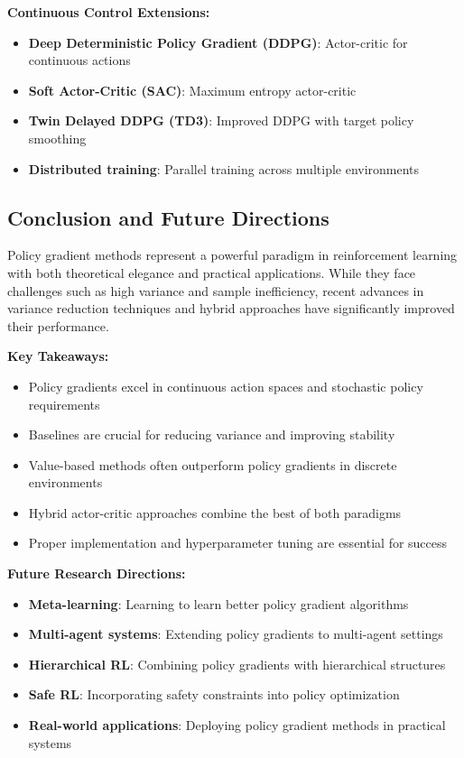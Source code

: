 \documentclass[12pt]{article}
\begin{document}
{{{\textbf{Continuous Control Extensions:}
\begin{itemize}
    \item \textbf{Deep Deterministic Policy Gradient (DDPG)}: Actor-critic for continuous actions
    \item \textbf{Soft Actor-Critic (SAC)}: Maximum entropy actor-critic
    \item \textbf{Twin Delayed DDPG (TD3)}: Improved DDPG with target policy smoothing
    \item \textbf{Distributed training}: Parallel training across multiple environments
\end{itemize}

\subsection{Conclusion and Future Directions}

Policy gradient methods represent a powerful paradigm in reinforcement learning with both theoretical elegance and practical applications. While they face challenges such as high variance and sample inefficiency, recent advances in variance reduction techniques and hybrid approaches have significantly improved their performance.

\textbf{Key Takeaways:}
\begin{itemize}
    \item Policy gradients excel in continuous action spaces and stochastic policy requirements
    \item Baselines are crucial for reducing variance and improving stability
    \item Value-based methods often outperform policy gradients in discrete environments
    \item Hybrid actor-critic approaches combine the best of both paradigms
    \item Proper implementation and hyperparameter tuning are essential for success
\end{itemize}

\textbf{Future Research Directions:}
\begin{itemize}
    \item \textbf{Meta-learning}: Learning to learn better policy gradient algorithms
    \item \textbf{Multi-agent systems}: Extending policy gradients to multi-agent settings
    \item \textbf{Hierarchical RL}: Combining policy gradients with hierarchical structures
    \item \textbf{Safe RL}: Incorporating safety constraints into policy optimization
    \item \textbf{Real-world applications}: Deploying policy gradient methods in practical systems
\end{itemize}

}}}
\end{document}
